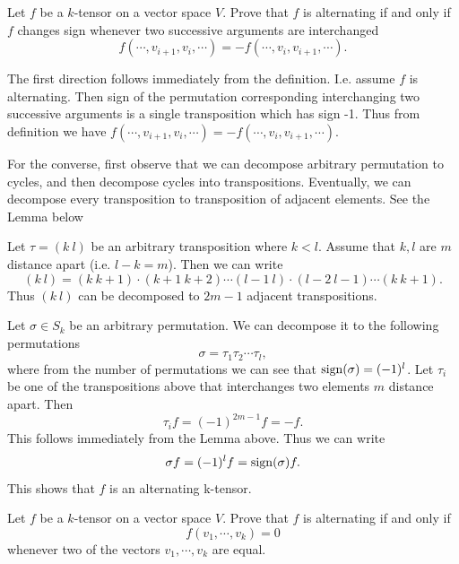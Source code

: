 \begin{problem}
	Let $ f $ be a $ k $-tensor on a vector space $ V $. Prove that $ f $ is alternating if and only if $ f $ changes sign whenever two successive arguments are interchanged
	\[ f(\cdots,v_{i+1},v_i,\cdots) = -f(\cdots, v_i, v_{i+1},\cdots). \]
\end{problem}

\begin{solution}
	The first direction follows immediately from the definition. I.e. assume $ f $ is alternating. Then sign of the permutation corresponding interchanging two successive arguments is a single transposition which has sign -1. Thus from definition we have $ f(\cdots,v_{i+1},v_i,\cdots) = -f(\cdots, v_i, v_{i+1},\cdots) $.
	
	\noindent For the converse, first observe that we can decompose arbitrary permutation to cycles, and then decompose cycles into transpositions. Eventually, we can decompose every transposition to transposition of adjacent elements. See the Lemma below
	\begin{lemma}
		Let $ \tau = (k\ l) $ be an arbitrary transposition where $ k < l $.  Assume that $ k,l $ are $ m $ distance apart (i.e. $ l-k = m $). Then we can write
		\[ (k\ l) = (k\ k+1)\cdot(k+1\ k+2)\cdots(l-1\ l)\cdot(l-2\ l-1)\cdots(k\ k+1). \]
		Thus $ (k\ l) $ can be decomposed to $ 2m - 1 $ adjacent transpositions.
	\end{lemma}
	
	Let $ \sigma \in S_k $ be an arbitrary permutation. We can decompose it to the following permutations
	\[ \sigma = \tau_1 \tau_2 \cdots \tau_l, \]
	where from the number of permutations we can see that $ \operatorname{sign}(\sigma) = (-1)^l $. Let $ \tau_i $ be one of the transpositions above that interchanges two elements $ m $ distance apart. Then
	\[ \tau_i f = (-1)^{2m-1}f = - f. \]
	This follows immediately from the Lemma above. Thus we can write
	\[ \sigma f = (-1)^l f = \operatorname{sign}(\sigma) f. \]
	This shows that $ f $ is an alternating k-tensor.
\end{solution}


\begin{problem}
	\label{problem:k-TensorCharacter}
	Let $ f $ be a $ k $-tensor on a vector space $ V $. Prove that $ f $ is alternating if and only if 
	\[ f(v_1,\cdots,v_k) = 0 \]
	whenever two of the vectors $ v_1,\cdots,v_k $ are equal.
\end{problem}


